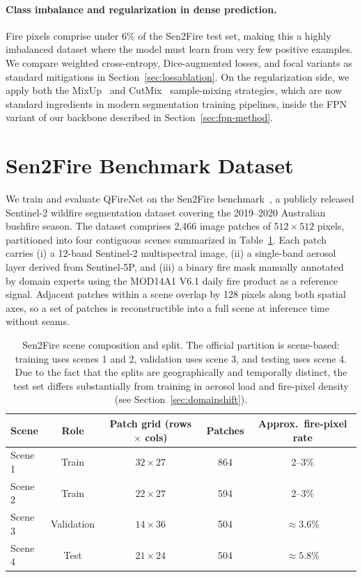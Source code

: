 \documentclass{article}
\newcommand{\projectname}{QFireNet}
\begin{document}
\paragraph{Class imbalance and regularization in dense prediction.} Fire pixels comprise under $6\%$ of the Sen2Fire test set, making this a highly imbalanced dataset where the model must learn from very few positive examples. We compare weighted cross-entropy, Dice-augmented losses, and focal variants as standard mitigations in Section~\ref{sec:lossablation}. On the regularization side, we apply both the MixUp~\cite{mixup} and CutMix~\cite{cutmix} sample-mixing strategies, which are now standard ingredients in modern segmentation training pipelines, inside the FPN variant of our backbone described in Section~\ref{sec:fpn-method}.

\section{Sen2Fire Benchmark Dataset}

We train and evaluate \projectname{} on the Sen2Fire benchmark~\cite{sen2fire}, a publicly released Sentinel-2 wildfire segmentation dataset covering the 2019--2020 Australian bushfire season. The dataset comprises 2{,}466 image patches of $512\times512$ pixels, partitioned into four contiguous scenes summarized in Table~\ref{tab:scenes}. Each patch carries (i) a 12-band Sentinel-2 multispectral image, (ii) a single-band aerosol layer derived from Sentinel-5P, and (iii) a binary fire mask manually annotated by domain experts using the MOD14A1 V6.1 daily fire product as a reference signal. Adjacent patches within a scene overlap by 128 pixels along both spatial axes, so a set of patches is reconstructible into a full scene at inference time without seams.

\begin{table}[H]
    \centering
    \begin{tabular}{lcccc}
        \toprule
        Scene & Role & Patch grid (rows $\times$ cols) & Patches & Approx.\ fire-pixel rate \\
        \midrule
        Scene 1 & Train & $32 \times 27$ & 864 & 2--3\% \\
        Scene 2 & Train & $22 \times 27$ & 594 & 2--3\% \\
        Scene 3 & Validation & $14 \times 36$ & 504 & $\approx 3.6$\% \\
        Scene 4 & Test & $21 \times 24$ & 504 & $\approx 5.8$\% \\
        \bottomrule
    \end{tabular}
    \caption{Sen2Fire scene composition and split. The official partition is scene-based: training uses scenes 1 and 2, validation uses scene 3, and testing uses scene 4. Due to the fact that the splits are geographically and temporally distinct, the test set differs substantially from training in aerosol load and fire-pixel density (see Section~\ref{sec:domainshift}).}
    \label{tab:scenes}
\end{table}
\end{document}
